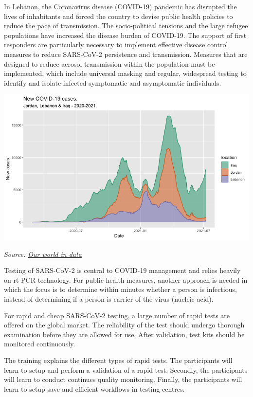 \documentclass[
]{book}
\begin{document}
In Lebanon, the Coronavirus disease (COVID-19) pandemic has disrupted
the lives of inhabitants and forced the country to devise public health
policies to reduce the pace of transmission. The socio-political
tensions and the large refugee populations have increased the disease
burden of COVID-19. The support of first responders are particularly
necessary to implement effective disease control measures to reduce
SARS-CoV-2 persistence and transmission. Measures that are designed to
reduce aerosol transmission within the population must be implemented,
which include universal masking and regular, widespread testing to
identify and isolate infected symptomatic and asymptomatic individuals.

\includegraphics{images/covid19_ME_210709.png}

\emph{Source: \href{https://ourworldindata.org/coronavirus}{Our world in data}}

Testing of SARS-CoV-2 is central to COVID-19 management and relies
heavily on rt-PCR technology. For public health measures, another
approach is needed in which the focus is to determine within minutes
whether a person is infectious, instead of determining if a person is
carrier of the virus (nucleic acid).

For rapid and cheap SARS-CoV-2 testing, a large number of rapid tests
are offered on the global market. The reliability of the test should
undergo thorough examination before they are allowed for use. After
validation, test kits should be monitored continuously.

The training explains the different types of rapid tests. The
participants will learn to setup and perform a validation of a rapid
test. Secondly, the participants will learn to conduct continues quality
monitoring. Finally, the participants will learn to setup save and
efficient workflows in testing-centres.
\end{document}

